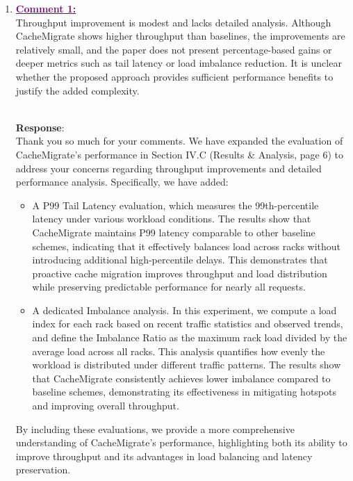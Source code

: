 \documentclass[11pt]{article}
\newenvironment{reply}
   {\medskip \noindent \color{blue} \begin{sf}\\ \textbf{Response}:\\  }
   {\medskip \par \end{sf}}
\newcommand{\comment}[1]{\textcolor{purple}{\textbf{\underline{Comment #1:}}}\\}
\DeclareRobustCommand{\thanksfor}[1]{Thank you so much for #1}
\begin{document}
\begin{enumerate}
    \item \comment{1} Throughput improvement is modest and lacks detailed analysis. Although CacheMigrate shows higher throughput than baselines, the improvements are relatively small, and the paper does not present percentage-based gains or deeper metrics such as tail latency or load imbalance reduction. It is unclear whether the proposed approach provides sufficient performance benefits to justify the added complexity.
          \begin{reply}
              \thanksfor{your comments}. We have expanded the evaluation of CacheMigrate's performance in Section IV.C (Results \& Analysis, page 6) to address your concerns regarding throughput improvements and detailed performance analysis. Specifically, we have added:

              \begin{itemize}
                  \item A P99 Tail Latency evaluation, which measures the 99th-percentile latency under various workload conditions. The results show that CacheMigrate maintains P99 latency comparable to other baseline schemes, indicating that it effectively balances load across racks without introducing additional high-percentile delays. This demonstrates that proactive cache migration improves throughput and load distribution while preserving predictable performance for nearly all requests.

                  \item A dedicated Imbalance analysis. In this experiment, we compute a load index for each rack based on recent traffic statistics and observed trends, and define the Imbalance Ratio as the maximum rack load divided by the average load across all racks. This analysis quantifies how evenly the workload is distributed under different traffic patterns. The results show that CacheMigrate consistently achieves lower imbalance compared to baseline schemes, demonstrating its effectiveness in mitigating hotspots and improving overall throughput.
              \end{itemize}

              By including these evaluations, we provide a more comprehensive understanding of CacheMigrate's performance, highlighting both its ability to improve throughput and its advantages in load balancing and latency preservation.
          \end{reply}


\end{enumerate}
\end{document}
